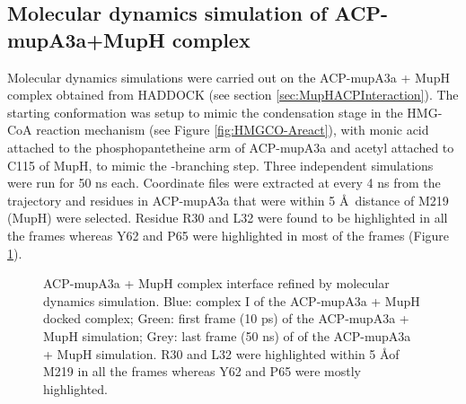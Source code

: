 	\subsection{Molecular dynamics simulation of ACP-mupA3a+MupH complex}
	\label{sec:chap4acpmuphmd}
	Molecular dynamics simulations were carried out on the ACP-mupA3a + MupH complex obtained from HADDOCK (see section \ref{sec:MupHACPInteraction}). The starting conformation was setup to mimic the condensation stage in the HMG-CoA reaction mechanism (see Figure \ref{fig:HMGCO-Areact}), with monic acid attached to the phosphopantetheine arm of ACP-mupA3a and acetyl attached to C115 of MupH, to mimic the \bet-branching step. Three independent simulations were run for 50 ns each. Coordinate files were extracted at every 4 ns from the trajectory and residues in ACP-mupA3a that were within 5 \AA \ distance of M219 (MupH) were selected. Residue R30 and L32 were found to be highlighted in all the frames whereas Y62 and P65 were highlighted in most of the frames (Figure \ref{fig:lmsimulation}).

		\setlength\fboxsep{5pt}
		\setlength\fboxrule{1.5pt}
		\begin{figure}[htbp]
		\centering
		\caption[ACP-mupA3a + MupH complex interface refined by molecular dynamics simulation.]{ACP-mupA3a + MupH complex interface refined by molecular dynamics simulation. Blue: complex I of the ACP-mupA3a + MupH docked complex; Green: first frame (10 ps) of the ACP-mupA3a + MupH simulation; Grey: last frame (50 ns)  of of the ACP-mupA3a + MupH simulation. R30 and L32 were highlighted within 5 \AA of M219 in all the frames whereas Y62 and P65 were mostly highlighted.}
		\label{fig:lmsimulation}
		\end{figure}	
	
